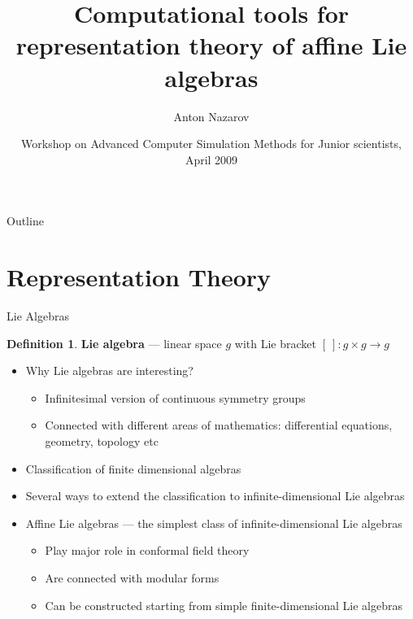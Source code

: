 \documentclass{beamer}
\title[Affine Lie algebra computations]{Computational tools for representation theory of affine Lie algebras}
\author{Anton Nazarov}
\institute[SPbSU]{
  Department of high-energy physics\\
  Saint-Petersburg State University}
\date[ACSM 2009] %
{Workshop on Advanced Computer Simulation Methods for Junior scientists, April 2009}
\theoremstyle{definition} \newtheorem{Def}{Definition}
\begin{document}
\maketitle
\begin{frame}{Outline}
  \tableofcontents
\end{frame}

\section{Representation Theory}
\label{sec:repr-theory}
\begin{frame}{Lie Algebras}
  \begin{Def}
    {\bf Lie algebra} --- linear space $g$ with Lie bracket $ \left[ \ \right]:g\times g \to g $
  \end{Def}
  \pause 
  \begin{itemize}
  \item Why Lie algebras are interesting?
    \begin{itemize}
      \pause 
    \item Infinitesimal version of continuous symmetry groups
      \pause 
    \item Connected with different areas of mathematics: differential equations, geometry, topology etc
      \pause
    \end{itemize}
  \item Classification of finite dimensional algebras
    \pause
  \item Several ways to extend the classification to infinite-dimensional Lie algebras
    \pause
  \item Affine Lie algebras --- the simplest class of infinite-dimensional Lie algebras
    \begin{itemize}
    \item Play major role in conformal field theory
    \item Are connected with modular forms
    \item Can be constructed starting from simple finite-dimensional Lie algebras
    \end{itemize}

  \end{itemize}

\end{frame}
\end{document}
